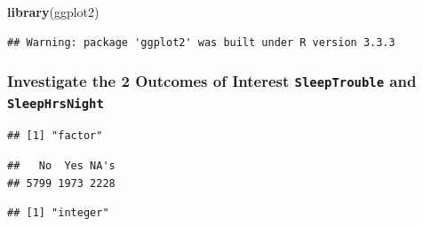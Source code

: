 \documentclass[]{article}
\newenvironment{Shaded}{\begin{snugshade}}{\end{snugshade}}
\newcommand{\KeywordTok}[1]{\textcolor[rgb]{0.13,0.29,0.53}{\textbf{{#1}}}}
\newcommand{\NormalTok}[1]{{#1}}
\begin{document}
\begin{Shaded}
\begin{Highlighting}[]
\KeywordTok{library}\NormalTok{(ggplot2)}
\end{Highlighting}
\end{Shaded}

\begin{verbatim}
## Warning: package 'ggplot2' was built under R version 3.3.3
\end{verbatim}

\subsubsection{\texorpdfstring{Investigate the 2 Outcomes of Interest
\texttt{SleepTrouble} and
\texttt{SleepHrsNight}}{Investigate the 2 Outcomes of Interest SleepTrouble and SleepHrsNight}}\label{investigate-the-2-outcomes-of-interest-sleeptrouble-and-sleephrsnight}

\begin{Shaded}
\end{Shaded}

\begin{verbatim}
## [1] "factor"
\end{verbatim}

\begin{Shaded}
\end{Shaded}

\begin{verbatim}
##   No  Yes NA's 
## 5799 1973 2228
\end{verbatim}

\begin{Shaded}
\end{Shaded}

\begin{verbatim}
## [1] "integer"
\end{verbatim}

\begin{Shaded}
\end{Shaded}
\end{document}
